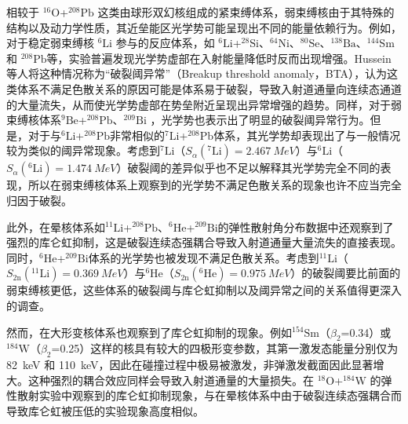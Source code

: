 \documentclass{npr}
\begin{document}
相较于 $^{16}\mathrm{O}$+$^{208}\mathrm{Pb}$ 这类由球形双幻核组成的紧束缚体系，弱束缚核由于其特殊的结构以及动力学性质，其近垒能区光学势可能呈现出不同的能量依赖行为\cite{hussein2006new,keeley2007fusion}。例如，对于稳定弱束缚核 $^{6}\mathrm{Li}$ 参与的反应体系，如 $^{6}\mathrm{Li}$+$^{28}\mathrm{Si}$\cite{pakou2004elastic}、$^{64}\mathrm{Ni}$\cite{biswas2008study}、$^{80}\mathrm{Se}$\cite{fimiani2012elastic}、$^{138}\mathrm{Ba}$\cite{maciel1999influence}、$^{144}\mathrm{Sm}$\cite{figueira2010energy} 和 $^{208}\mathrm{Pb}$\cite{keeley1994optical}等，实验普遍发现光学势虚部在入射能量降低时反而出现增强。Hussein等人将这种情况称为“破裂阈异常”（Breakup threshold anomaly，BTA）\cite{hussein2006new}，认为这类体系不满足色散关系的原因可能是体系易于破裂，导致入射道通量向连续态通道的大量流失，从而使光学势虚部在势垒附近呈现出异常增强的趋势。同样，对于弱束缚核体系$^{9}\mathrm{Be}$+$^{208}\mathrm{Pb}$、$^{209}\mathrm{Bi}$
\cite{gomez2015energy}，光学势也表示出了明显的破裂阈异常行为。但是，对于与$^{6}\mathrm{Li}$+$^{208}\mathrm{Pb}$非常相似的$^{7}\mathrm{Li}$+$^{208}\mathrm{Pb}$体系，其光学势却表现出了与一般情况较为类似的阈异常现象\cite{黄志杰2024近库仑势垒能区}。考虑到$^{7}\mathrm{Li}$（$S_{\alpha}(^7\mathrm{Li})=2.467~MeV$）与$^{6}\mathrm{Li}$（$S_{\alpha}(^6\mathrm{Li})=1.474~MeV$）破裂阈的差异似乎也不足以解释其光学势完全不同的表现，所以在弱束缚核体系上观察到的光学势不满足色散关系的现象也许不应当完全归因于破裂。

此外，在晕核体系如$^{11}\mathrm{Li}$+$^{208}\mathrm{Pb}$\cite{cubero2012halo}、$^{6}\mathrm{He}$+$^{209}\mathrm{Bi}$\cite{yang2014optical}的弹性散射角分布数据中还观察到了强烈的库仑虹抑制，这是破裂连续态强耦合导致入射道通量大量流失的直接表现。同时，$^{6}\mathrm{He}$+$^{209}\mathrm{Bi}$体系的光学势也被发现不满足色散关系。考虑到$^{11}\mathrm{Li}$（$S_{2\mathrm{n}}(^{11}\mathrm{Li})=0.369~MeV$）与$^{6}\mathrm{He}$（$S_{2\mathrm{n}}(^6\mathrm{He})=0.975~MeV$）的破裂阈要比前面的弱束缚核更低，这些体系的破裂阈与库仑虹抑制以及阈异常之间的关系值得更深入的调查。

然而，在大形变核体系也观察到了库仑虹抑制的现象。例如$^{154}\mathrm{Sm}$（$\beta_2$=0.34）或 $^{184}\mathrm{W}$（$\beta_2$=0.25）这样的核具有较大的四极形变参数，其第一激发态能量分别仅为 82~keV 和 110~keV，因此在碰撞过程中极易被激发，非弹激发截面因此显著增大。这种强烈的耦合效应同样会导致入射道通量的大量损失\cite{love1977dynamic}。在 $^{18}\mathrm{O}$+$^{184}\mathrm{W}$ 的弹性散射实验中\cite{thorn1977effect}观察到的库仑虹抑制现象，与在晕核体系中由于破裂连续态强耦合而导致库仑虹被压低的实验现象高度相似\cite{yang2014optical}。
\end{document}
